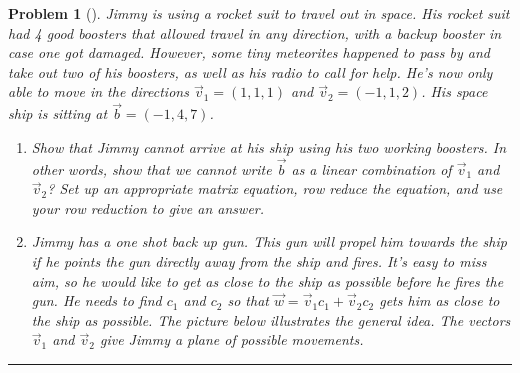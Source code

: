 \documentclass[letterpaper,oneside]{book}%
\theoremstyle{plain}
\theoremstyle{box}
\theoremstyle{problem}
\newtheorem{problemnum}{Problem}[chapter]
\newenvironment{problem}[1][]{\begin{problemnum}[#1]}{\end{problemnum}\nopagebreak\hrule\bigskip}
\begin{document}
\begin{problem}
Jimmy is using a rocket suit to travel out in space. His rocket suit had 4 good boosters that allowed travel in any direction, with a backup booster in case one got damaged.  However, some tiny meteorites happened to pass by and take out two of his boosters, as well as his radio to call for help.  He's now only able to move in the directions $\vec v_1=(1,1,1)$ and $\vec v_2=(-1,1,2)$.  His space ship is sitting at $\vec b=(-1,4,7)$.
\begin{enumerate}
 \item 
 Show that Jimmy cannot arrive at his ship using his two working boosters.  In other words, show that we cannot write $\vec b$ as a linear combination of $\vec v_1$ and $\vec v_2$? Set up an appropriate matrix equation, row reduce the equation, and use your row reduction to give an answer. 
 \item 
 Jimmy has a one shot back up gun.  This gun will propel him towards the ship if he points the gun directly away from the ship and fires.  
 It's easy to miss aim, so he would like to get as close to the ship as possible before he fires the gun. 
 He needs to find $c_1$ and $c_2$ so that $\vec w = \vec v_1 c_1+\vec v_2 c_2$ gets him as close to the ship as possible. The picture below illustrates the general idea. The vectors $\vec v_1$ and $\vec v_2$ give Jimmy a plane of possible movements. 
\begin{center}	
\end{center}
\end{enumerate}
\end{problem}
\end{document}
